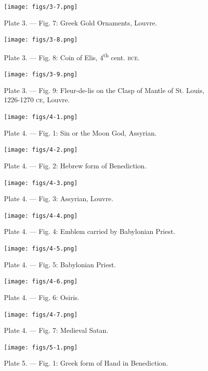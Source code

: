 \documentclass[a4paper, 11pt, oneside, english, landscape, twocolumn]{article}
\begin{document}
\begin{figure}[H]
\centering
\texttt{[image: figs/3-7.png]}
\caption{Plate 3. --- Fig. 7: Greek Gold Ornaments, Louvre.}
\end{figure}

\begin{figure}[H]
\centering
\texttt{[image: figs/3-8.png]}
\caption{Plate 3. --- Fig. 8: Coin of Elis, 4\textsuperscript{th} cent. \textsc{bce}.}
\end{figure}

\begin{figure}[H]
\centering
\texttt{[image: figs/3-9.png]}
\caption{Plate 3. --- Fig. 9: Fleur-de-lis on the Clasp of Mantle of St. Louis, 1226-1270 \textsc{ce}, Louvre.}
\end{figure}

\begin{figure}[H]
\centering
\texttt{[image: figs/4-1.png]}
\caption{Plate 4. --- Fig. 1: Sin or the Moon God, Assyrian.}
\end{figure}

\begin{figure}[H]
\centering
\texttt{[image: figs/4-2.png]}
\caption{Plate 4. --- Fig. 2: Hebrew form of Benediction.}
\end{figure}

\begin{figure}[H]
\centering
\texttt{[image: figs/4-3.png]}
\caption{Plate 4. --- Fig. 3: Assyrian, Louvre.}
\end{figure}

\begin{figure}[H]
\centering
\texttt{[image: figs/4-4.png]}
\caption{Plate 4. --- Fig. 4: Emblem carried by Babylonian Priest.}
\end{figure}

\begin{figure}[H]
\centering
\texttt{[image: figs/4-5.png]}
\caption{Plate 4. --- Fig. 5: Babylonian Priest.}
\end{figure}

\begin{figure}[H]
\centering
\texttt{[image: figs/4-6.png]}
\caption{Plate 4. --- Fig. 6: Osiris.}
\end{figure}

\begin{figure}[H]
\centering
\texttt{[image: figs/4-7.png]}
\caption{Plate 4. --- Fig. 7: Medieval Satan.}
\end{figure}

\begin{figure}[H]
\centering
\texttt{[image: figs/5-1.png]}
\caption{Plate 5. --- Fig. 1: Greek form of Hand in Benediction.}
\end{figure}
\end{document}
